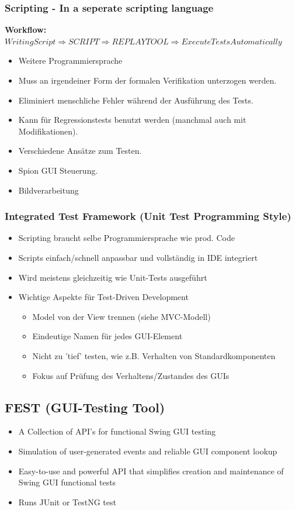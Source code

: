 \documentclass[a4paper,10pt]{article}
\newcommand{\Bold}[1]{\textbf{#1}} %
\begin{document}
\subsubsection{Scripting - In a seperate scripting language}
\textbf{\Bold Workflow:} $Writing Script \Longrightarrow SCRIPT \Longrightarrow REPLAY TOOL \Longrightarrow Execute Tests Automatically$

\begin{itemize}
\item Weitere Programmiersprache
\item Muss an irgendeiner Form der formalen Verifikation unterzogen werden.
\item Eliminiert menschliche Fehler während der Ausführung des Tests.
\item Kann für Regressionstests benutzt werden (manchmal auch mit Modifikationen).
\item Verschiedene Ansätze zum Testen.
\item Spion GUI Steuerung.
\item Bildverarbeitung
\end{itemize}

\subsubsection{Integrated Test Framework (Unit Test Programming Style)}
\begin{itemize}
\item Scripting braucht selbe Programmiersprache wie prod. Code
\item Scripts einfach/schnell anpassbar und vollständig in IDE integriert
\item Wird meistens gleichzeitig wie Unit-Tests ausgeführt
\item Wichtige Aspekte für Test-Driven Development
\begin{itemize}
\item Model von der View trennen (siehe MVC-Modell)
\item Eindeutige Namen für jedes GUI-Element
\item Nicht zu 'tief' testen, wie z.B. Verhalten von Standardkomponenten
\item Fokus auf Prüfung des Verhaltens/Zustandes des GUIs
\end{itemize}
\end{itemize}

\subsection{FEST (GUI-Testing Tool)}
\begin{itemize}
\item A Collection of API's for functional Swing GUI testing
\item Simulation of user-generated events and reliable GUI component lookup
\item Easy-to-use and powerful API that simplifies creation and maintenance of Swing GUI functional tests
\item Runs JUnit or TestNG test
\end{itemize}
\end{document}
